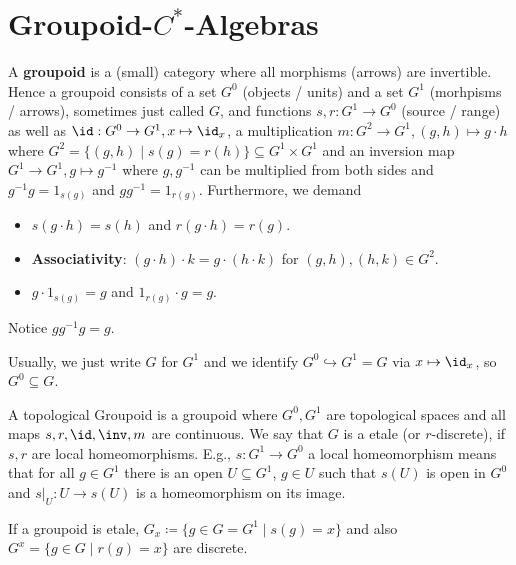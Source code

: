 \documentclass[a4paper]{article}
\begin{document}
\section{Groupoid-$C^*$-Algebras}

\begin{definition}
	A \textbf{groupoid} is a (small) category where all morphisms (arrows) are invertible.
	Hence a groupoid consists of a set $G^0$ (objects / units) and a set $G^1$ (morhpisms / arrows), sometimes just called $G$, and functions $s, r: G^1 \to G^0$ (source / range) as well as $\id: G^0 \to G^1, x \mapsto \id_x$, a multiplication $m: G^2 \to G^1, (g, h) \mapsto g \cdot h$ where $G^2 = \{(g,h) \mid s(g) = r(h) \} \subseteq G^1 \times G^1$ and an inversion map $G^1 \to G^1, g \mapsto g^{-1}$ where $g, g^{-1}$ can be multiplied from both sides and $g^{-1} g = 1_{s(g)}$ and $g g^{-1} = 1_{r(g)}$.
	Furthermore, we demand
	\begin{itemize}
		\item $s(g \cdot h) = s(h)$ and $r(g \cdot h) = r(g)$.
		\item \textbf{Associativity}: $(g \cdot h) \cdot k = g \cdot (h \cdot k)$ for $(g,h), (h,k) \in G^2$.
		\item $g \cdot 1_{s(g)} = g$ and $1_{r(g)} \cdot g = g$.
	\end{itemize}
\end{definition}

\begin{remark}
	Notice $g g^{-1} g = g$.

	Usually, we just write $G$ for $G^1$ and we identify $G^0 \hookrightarrow G^1 = G$ via $x \mapsto \id_x$, so $G^0 \subseteq G$.
\end{remark}

\begin{definition}
	A topological Groupoid is a groupoid where $G^0, G^1$ are topological spaces and all maps $s, r, \id , \inv, m$ are continuous.
	We say that $G$ is a etale (or $r$-discrete), if $s, r$ are local homeomorphisms.
	E.g., $s: G^1 \to G^0$ a local homeomorphism means that for all $g \in G^1$ there is an open $U \subseteq G^1$, $g \in U$ such that $s(U)$ is open in $G^0$ and $s|_U: U \to s(U)$ is a homeomorphism on its image.
\end{definition}

\begin{remark}
	If a groupoid is etale, $G_x \coloneq \{g \in G = G^1 \mid s(g) = x \}$ and also $G^x = \{g \in G \mid r(g) = x\}$ are discrete. 
\end{remark}
\end{document}
